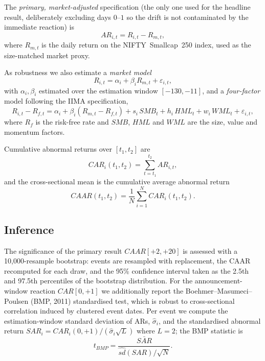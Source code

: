 The \emph{primary, market-adjusted} specification (the only one used for
the headline result, deliberately excluding days $0$--$1$ so the drift is
not contaminated by the immediate reaction) is
\begin{equation}
  AR_{i,t} = R_{i,t} - R_{m,t},
\end{equation}
where $R_{m,t}$ is the daily return on the NIFTY~Smallcap~250 index, used
as the size-matched market proxy.

As robustness we also estimate a \emph{market model}
\begin{equation}
  R_{i,t} = \alpha_i + \beta_i R_{m,t} + \varepsilon_{i,t},
\end{equation}
with $\alpha_i,\beta_i$ estimated over the estimation window
$[-130,-11]$, and a \emph{four-factor} model following the IIMA
specification,
\begin{equation}
  R_{i,t} - R_{f,t} = \alpha_i + \beta_i(R_{m,t}-R_{f,t})
    + s_i\,SMB_t + h_i\,HML_t + w_i\,WML_t + \varepsilon_{i,t},
\end{equation}
where $R_f$ is the risk-free rate and $SMB$, $HML$ and $WML$ are the
size, value and momentum factors.

Cumulative abnormal returns over $[t_1,t_2]$ are
\begin{equation}
  CAR_i(t_1,t_2) = \sum_{t=t_1}^{t_2} AR_{i,t},
\end{equation}
and the cross-sectional mean is the cumulative average abnormal return
\begin{equation}
  CAAR(t_1,t_2) = \frac{1}{N}\sum_{i=1}^{N} CAR_i(t_1,t_2).
\end{equation}

\subsection{Inference}
\label{sec:inference}

The significance of the primary result $CAAR[+2,+20]$ is assessed with a
10,000-resample bootstrap: events are resampled with replacement, the CAAR
recomputed for each draw, and the 95\% confidence interval taken as the
2.5th and 97.5th percentiles of the bootstrap distribution. For the
announcement-window reaction $CAR[0,+1]$ we additionally report the
Boehmer--Masumeci--Poulsen (BMP, 2011) standardised test, which is robust
to cross-sectional correlation induced by clustered event dates. Per event
we compute the estimation-window standard deviation of ARs,
$\hat\sigma_i$, and the standardised abnormal return
$SAR_i = CAR_i(0,+1)/(\hat\sigma_i\sqrt{L})$ where $L=2$; the BMP
statistic is
\begin{equation}
  t_{\mathit{BMP}} = \frac{\bar{SAR}}{\widehat{sd}(SAR)/\sqrt{N}}.
\end{equation}

